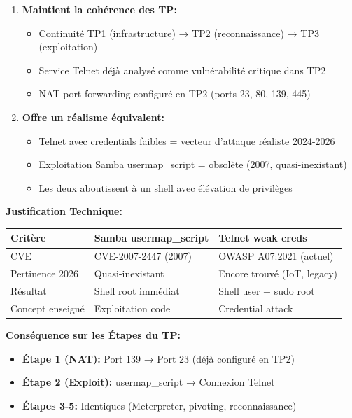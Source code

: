 \documentclass[12pt,a4paper,openany]{report}
\begin{document}
\begin{tcolorbox}[colback=secondary!5!white, colframe=secondary, 
	title=\textbf{ADAPTATION TECHNIQUE DU TP3},
	breakable]
\begin{enumerate}
		\item \textbf{Maintient la cohérence des TP:}
		\begin{itemize}
			\item Continuité TP1 (infrastructure) → TP2 (reconnaissance) → TP3 (exploitation)
			\item Service Telnet déjà analysé comme vulnérabilité critique dans TP2
			\item NAT port forwarding configuré en TP2 (ports 23, 80, 139, 445)
		\end{itemize}
		
		\item \textbf{Offre un réalisme équivalent:}
		\begin{itemize}
			\item Telnet avec credentials faibles \mbox{=} vecteur d'attaque réaliste 2024-2026
			\item Exploitation Samba usermap\_script = obsolète (2007, quasi-inexistant)
			\item Les deux aboutissent à un shell avec élévation de privilèges
		\end{itemize}
	\end{enumerate}
	
	\textbf{Justification Technique:}
	
	\begin{center}
		\small
		\renewcommand{\arraystretch}{1.3}
		\begin{tabular}{p{3cm} p{4.5cm} p{4cm}}
			\hline
			\textbf{Critère} & \textbf{Samba usermap\_script} & \textbf{Telnet weak creds} \\
			\hline
			CVE & CVE-2007-2447 (2007) & OWASP A07:2021 (actuel) \\
			Pertinence 2026 & Quasi-inexistant & Encore trouvé (IoT, legacy) \\
			Résultat & Shell root immédiat & Shell user + sudo root \\
			Concept enseigné & Exploitation code & Credential attack \\
			\hline
		\end{tabular}
	\end{center}
	
	\textbf{Conséquence sur les Étapes du TP:}
	
	\begin{itemize}
		\item \textbf{Étape 1 (NAT):} Port 139 → Port 23 (déjà configuré en TP2)
		\item \textbf{Étape 2 (Exploit):} usermap\_script → Connexion Telnet
		\item \textbf{Étapes 3-5:} Identiques (Meterpreter, pivoting, reconnaissance)
	\end{itemize}
	

\end{tcolorbox}
\end{document}
